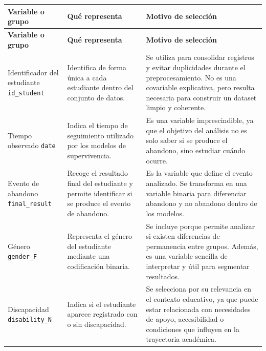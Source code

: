 \small
\begin{longtable}{|>{\raggedright\arraybackslash}p{3.2cm}|>{\raggedright\arraybackslash}p{4.2cm}|>{\raggedright\arraybackslash}p{6.1cm}|}
\hline
\textbf{Variable o grupo} & \textbf{Qué representa} & \textbf{Motivo de selección} \\ \hline
\endfirsthead

\hline
\textbf{Variable o grupo} & \textbf{Qué representa} & \textbf{Motivo de selección} \\ \hline
\endhead

Identificador del estudiante \newline \texttt{id\_student} & Identifica de forma única a cada estudiante dentro del conjunto de datos. & Se utiliza para consolidar registros y evitar duplicidades durante el preprocesamiento. No es una covariable explicativa, pero resulta necesaria para construir un dataset limpio y coherente. \\ \hline

Tiempo observado \newline \texttt{date} & Indica el tiempo de seguimiento utilizado por los modelos de supervivencia. & Es una variable imprescindible, ya que el objetivo del análisis no es solo saber si se produce el abandono, sino estudiar cuándo ocurre. \\ \hline

Evento de abandono \newline \texttt{final\_result} & Recoge el resultado final del estudiante y permite identificar si se produce el evento de abandono. & Es la variable que define el evento analizado. Se transforma en una variable binaria para diferenciar abandono y no abandono dentro de los modelos. \\ \hline

Género \newline \texttt{gender\_F} & Representa el género del estudiante mediante una codificación binaria. & Se incluye porque permite analizar si existen diferencias de permanencia entre grupos. Además, es una variable sencilla de interpretar y útil para segmentar resultados. \\ \hline

Discapacidad \newline \texttt{disability\_N} & Indica si el estudiante aparece registrado con o sin discapacidad. & Se selecciona por su relevancia en el contexto educativo, ya que puede estar relacionada con necesidades de apoyo, accesibilidad o condiciones que influyen en la trayectoria académica. \\ \hline


\end{longtable}
